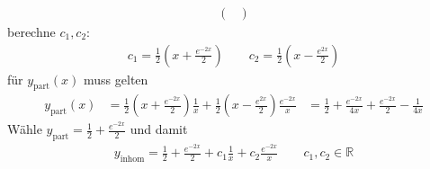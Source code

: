 \begin{example}
\begin{enum-arab}
\begin{align*}
\begin{pmatrix}
				\end{pmatrix}
			\end{align*}
			berechne $c_1, c_2$:
			\begin{align*}
				c_1 = \frac 12 (x + \tfrac {e^{-2x}}2)
				\qquad
				c_2 = \frac 12 (x - \tfrac {e^{2x}}2)
			\end{align*}
			für $y_{\text{part}} (x)$ muss gelten
			\begin{align*}
				y_{\text{part}} (x) &= \frac 12 (x + \tfrac{e^{-2x}}2)\frac 1x + \frac 12 (x - \tfrac {e^{2x}}2) \frac {e^{-2x}}x
				&= \frac 12 + \frac {e^{-2x}}{4x} + \frac {e^{-2x}}2 - \frac 1{4x}
			\end{align*}
			Wähle $y_{\text{part}} = \frac 12 + \frac {e^{-2x}}2$ und damit
			\begin{align*}
				y_{\text{inhom}} = \frac 12 + \frac {e^{-2x}}2 + c_1 \frac 1x + c_2 \frac {e^{-2x}}x
				\qquad
				c_1, c_2 \in \mathbb{R}
			\end{align*}
	\end{enum-arab}
\end{example}


